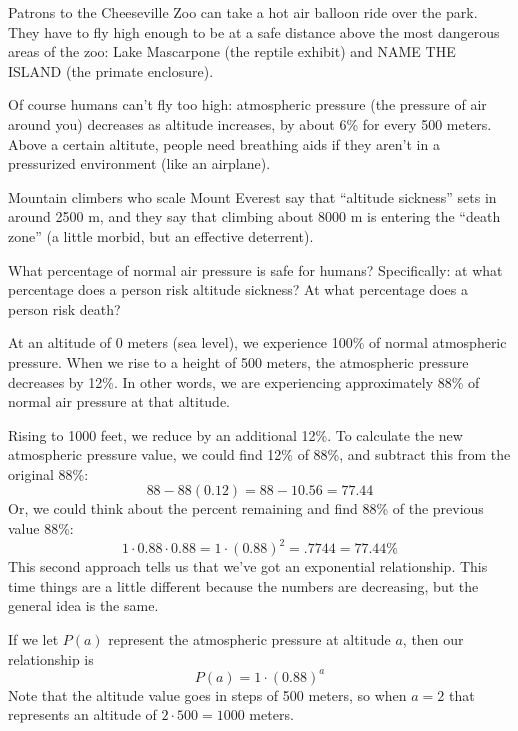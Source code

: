 
\begin{boxedexplore}[No pressure]
Patrons to the Cheeseville Zoo can take a hot air balloon ride over the park. They have to fly high enough to be at a safe distance above the most dangerous areas of the zoo: Lake Mascarpone (the reptile exhibit) and NAME THE ISLAND (the primate enclosure).

Of course humans can't fly too high: atmospheric pressure (the pressure of air around you) decreases as altitude increases, by about 6\% for every 500 meters. Above a certain altitute, people need breathing aids if they aren't in a pressurized environment (like an airplane).

Mountain climbers who scale Mount Everest say that ``altitude sickness'' sets in around 2500 m, and they say that climbing about 8000 m is entering the ``death zone'' (a little morbid, but an effective deterrent).

What percentage of normal air pressure is safe for humans? Specifically: at what percentage does a person risk altitude sickness? At what percentage does a person risk death?

\end{boxedexplore}

At an altitude of 0 meters (sea level), we experience 100\% of normal atmospheric pressure. When we rise to a height of 500 meters, the atmospheric pressure decreases by 12\%. In other words, we are experiencing approximately 88\% of normal air pressure at that altitude.

Rising to 1000 feet, we reduce by an additional 12\%. To calculate the new atmospheric pressure value, we could find 12\% of 88\%, and subtract this from the original 88\%:
\[88 - 88(0.12) = 88 - 10.56 = 77.44\]
Or, we could think about the percent remaining and find 88\% of the previous value 88\%:
\[1\cdot0.88\cdot0.88 = 1\cdot(0.88)^2 = .7744 = 77.44\%\]
This second approach tells us that we've got an exponential relationship. This time things are a little different because the numbers are decreasing, but the general idea is the same.

If we let $P(a)$ represent the atmospheric pressure at altitude $a$, then our relationship is
\[P(a) = 1 \cdot (0.88)^a\]
Note that the altitude value goes in steps of 500 meters, so when $a=2$ that represents an altitude of $2\cdot500 = 1000$ meters.

